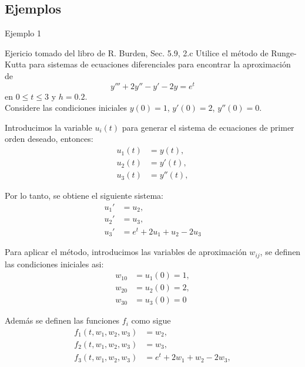 \subsection{Ejemplos}
\begin{frame}{Ejemplo 1}
\begin{block}{Ejericio tomado del libro de R. Burden, Sec. 5.9, 2.c}
Utilice el método de Runge-Kutta para sistemas de ecuaciones diferenciales para encontrar la aproximación de 
$$y'''+2y''-y'-2y=e^t$$
en $0 \leq t \leq 3$ y $h=0.2$. \\
Considere las condiciones iniciales $y(0)=1$, $y'(0)=2$, $y''(0)=0$.\\
\end{block}

\vspace{1cm}
Introducimos la variable $u_i(t)$ para generar el sistema de ecuaciones de primer orden deseado, entonces:
\begin{align*}
u_1(t) &= y(t),\\
u_2(t) &= y'(t),\\
u_3(t) &= y''(t),
\end{align*}
\end{frame}


\begin{frame}
Por lo tanto, se obtiene el siguiente sistema:
\begin{align*}
u_1' &= u_2,\\
u_2' &= u_3,\\
u_3' &= e^t+2u_1+u_2-2u_3
\end{align*}

Para aplicar el método, introducimos las variables de aproximación $w_{ij}$, se definen las condiciones iniciales asi:
\begin{align*}
w_{10} &= u_1(0)=1,\\
w_{20} &= u_2(0)=2,\\
w_{30} &= u_3(0)=0
\end{align*}

 Además se definen las funciones $f_i$ como sigue
 \begin{align*}
 f_1(t, w_1, w_2, w_3)&=w_2,\\
 f_2(t, w_1, w_2, w_3)&=w_3,\\
 f_3(t, w_1, w_2, w_3)&=e^t+2w_1+w_2-2w_3,\\
 \end{align*}
\end{frame}

